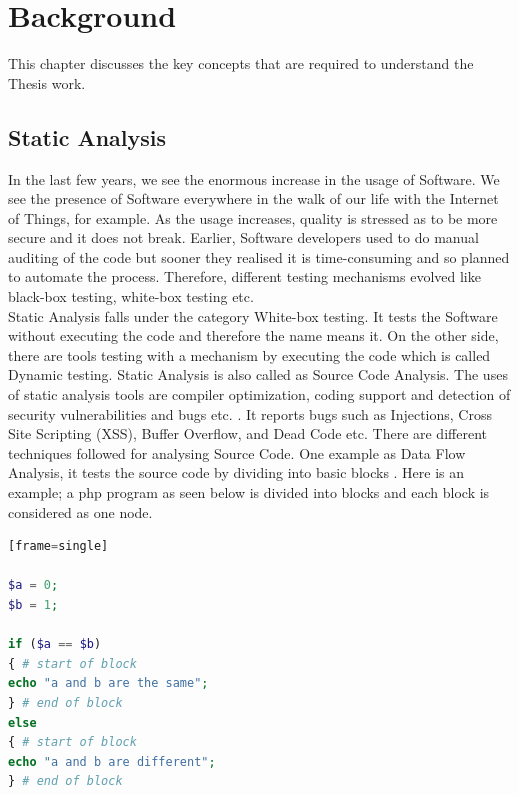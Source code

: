 \chapter{Background}
\label{ch:background}

This chapter discusses the key concepts that are required to understand the Thesis work.

\section{Static Analysis}

In the last few years, we see the enormous increase in the usage of Software. We see the presence of Software everywhere in the walk of our life with the Internet of Things, for example. As the usage increases, quality is stressed as to be more secure and it does not break. Earlier, Software developers used to do manual auditing of the code but sooner they realised it is time-consuming and so planned to automate the process. Therefore, different testing mechanisms evolved like black-box testing, white-box testing etc. \\

Static Analysis falls under the category White-box testing. It tests the Software without executing the code and therefore the name means it. On the other side, there are tools testing with a mechanism by executing the code which is called Dynamic testing. Static Analysis is also called as Source Code Analysis. The uses of static analysis tools are compiler optimization, coding support and detection of security vulnerabilities and bugs etc. \cite{deca}. It reports bugs such as Injections, Cross Site Scripting (XSS), Buffer Overflow, and Dead Code etc. \cite{bugs} There are different techniques followed for analysing Source Code. One example as Data Flow Analysis, it tests the source code by dividing into basic blocks \cite{Woegerer}. Here is an example; a php program as seen below is divided into blocks and each block is considered as one node.

\begin{lstlisting}[showstringspaces=false, language=PHP][frame=single]

$a = 0;
$b = 1;

if ($a == $b)
{ # start of block
echo "a and b are the same";
} # end of block
else
{ # start of block
echo "a and b are different";
} # end of block


\end{lstlisting}


